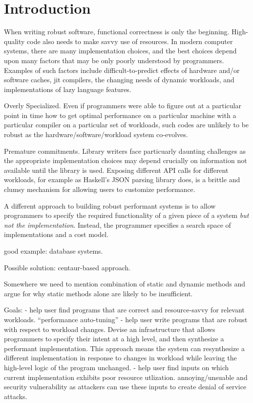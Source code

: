 
\section{Introduction}


When writing robust software, functional correctness is only the
beginning.  High-quality code also needs to make savvy use of
resources.  In modern computer systems, there are many implementation
choices, and the best choices depend upon many factors that may be
only poorly understood by programmers.  Examples of such factors
include difficult-to-predict effects of hardware and/or software
caches, jit compilers, the changing needs of dynamic workloads, and
implementations of lazy language features.   


Overly Specialized.
Even if programmers were able to figure out at a particular point in
time how to get optimal performance on a particular machine with a
particular compiler on a particular set of workloads, such codes are
unlikely to be robust as the hardware/software/workload system
co-evolves.


Premature commitments. 
Library writers face particuarly daunting challenges as the
appropriate implementation choices may depend crucially on information
not available until the library is used.  Exposing different API calls
for different workloads, for example as Haskell's JSON parsing library
does, is a brittle and clumsy mechanism for allowing users to
customize performance.

A different approach to building robust performant systems is to allow
programmers to specify the required functionality of a given piece of
a system \textit{but not the implementation}.  
Instead, the programmer specifies a search space of implementations
and a cost model.   



  good example: database systems. 

Possible solution: centaur-based approach.  


Somewhere we need to mention combination of static and dynamic methods
and argue for why static methods alone are likely to be insufficient.

Goals:
  - help user find programs that are correct and resource-savvy for
  relevant workloads.  ``performance auto-tuning''
  - help user write programs that are robust with respect to workload
  changes.  Devise an infrastructure that allows programmers to specify their
  intent at a high level, and then synthesize a performant
  implementation.  This approach means the system can resynthesize a
  different implementation in response to changes in workload while
  leaving the high-level logic of the program unchanged.  
  - help user find inputs on which current implementation exhibits
  poor resource utlization.  annoying/unsuable and security
  vulnerability as attackers can use these inputs to create denial of
  service attacks. 


